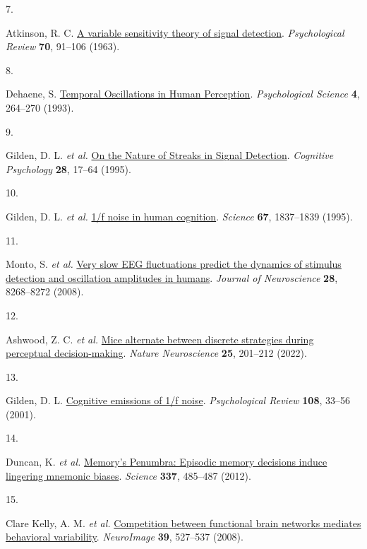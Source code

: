 \documentclass[
]{article}
\newlength{\cslhangindent}
\newlength{\csllabelwidth}
\newlength{\cslentryspacingunit} %
\newenvironment{CSLReferences}[2] %
 {%
  \setlength{\parindent}{0pt}
  \ifodd #1
  \let\oldpar\par
  \def\par{\hangindent=\cslhangindent\oldpar}
  \fi
  \setlength{\parskip}{#2\cslentryspacingunit}
 }%
 {}
\newcommand{\CSLLeftMargin}[1]{\parbox[t]{\csllabelwidth}{#1}}
\newcommand{\CSLRightInline}[1]{\parbox[t]{\linewidth - \csllabelwidth}{#1}\break}
\begin{document}
\begin{CSLReferences}{0}{0}
\leavevmode{}%
\CSLLeftMargin{7. }%
\CSLRightInline{Atkinson, R. C.
\href{https://doi.org/10.1037/h0041428}{{A variable sensitivity theory
of signal detection}}. \emph{Psychological Review} \textbf{70}, 91--106
(1963).}

\leavevmode{}%
\CSLLeftMargin{8. }%
\CSLRightInline{Dehaene, S.
\href{https://doi.org/10.1111/j.1467-9280.1993.tb00273.x}{{Temporal
Oscillations in Human Perception}}. \emph{Psychological Science}
\textbf{4}, 264--270 (1993).}

\leavevmode{}%
\CSLLeftMargin{9. }%
\CSLRightInline{Gilden, D. L. \emph{et al.}
\href{https://doi.org/10.1006/cogp.1995.1002}{{On the Nature of Streaks
in Signal Detection}}. \emph{Cognitive Psychology} \textbf{28}, 17--64
(1995).}

\leavevmode{}%
\CSLLeftMargin{10. }%
\CSLRightInline{Gilden, D. L. \emph{et al.}
\href{https://doi.org/10.1126/science.7892611}{1/f noise in human
cognition}. \emph{Science} \textbf{67}, 1837--1839 (1995).}

\leavevmode{}%
\CSLLeftMargin{11. }%
\CSLRightInline{Monto, S. \emph{et al.}
\href{https://doi.org/10.1523/JNEUROSCI.1910-08.2008}{{Very slow EEG
fluctuations predict the dynamics of stimulus detection and oscillation
amplitudes in humans}}. \emph{Journal of Neuroscience} \textbf{28},
8268--8272 (2008).}

\leavevmode{}%
\CSLLeftMargin{12. }%
\CSLRightInline{Ashwood, Z. C. \emph{et al.}
\href{https://doi.org/10.1038/s41593-021-01007-z}{{Mice alternate
between discrete strategies during perceptual decision-making}}.
\emph{Nature Neuroscience} \textbf{25}, 201--212 (2022).}

\leavevmode{}%
\CSLLeftMargin{13. }%
\CSLRightInline{Gilden, D. L.
\href{https://doi.org/10.1037/0033-295X.108.1.33}{{Cognitive emissions
of 1/f noise}}. \emph{Psychological Review} \textbf{108}, 33--56
(2001).}

\leavevmode{}%
\CSLLeftMargin{14. }%
\CSLRightInline{Duncan, K. \emph{et al.}
\href{https://doi.org/10.1126/science.1221936}{{Memory's Penumbra:
Episodic memory decisions induce lingering mnemonic biases}}.
\emph{Science} \textbf{337}, 485--487 (2012).}

\leavevmode{}%
\CSLLeftMargin{15. }%
\CSLRightInline{Clare Kelly, A. M. \emph{et al.}
\href{https://doi.org/10.1016/j.neuroimage.2007.08.008}{{Competition
between functional brain networks mediates behavioral variability}}.
\emph{NeuroImage} \textbf{39}, 527--537 (2008).}


\end{CSLReferences}
\end{document}
